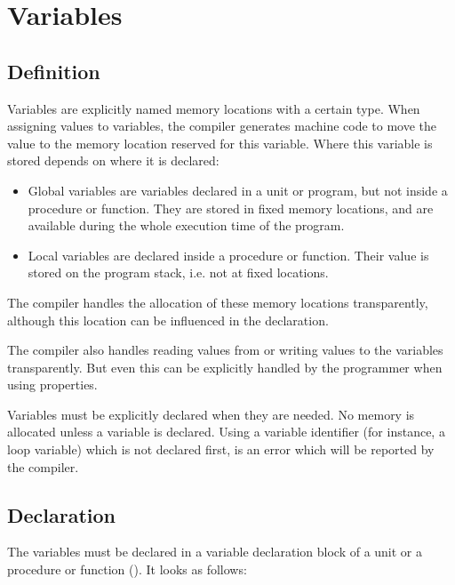 \chapter{Variables}
\label{ch:Variables}
\section{Definition}
Variables are explicitly named memory locations with a certain type. When
assigning values to variables, the \fpc compiler generates machine code 
to move the value to the memory location reserved for this variable. Where
this variable is stored depends on where it is declared:

\begin{itemize}
\item Global variables are variables declared in a unit or program, but not
inside a procedure or function. They are stored in fixed memory locations,
and are available during the whole execution time of the program.
\item Local variables are declared inside a procedure or function. Their
value is stored on the program stack, i.e. not at fixed locations.
\end{itemize}

The \fpc compiler handles the allocation of these memory locations
transparently, although this location can be influenced in the declaration.

The \fpc compiler also handles reading values from or writing values to
the variables transparently. But even this can be explicitly handled by the
programmer when using properties.

Variables must be explicitly declared when they are needed. No memory is
allocated unless a variable is declared. Using a variable identifier (for
instance, a loop variable) which is not declared first, is an error which
will be reported by the compiler. 

\section{Declaration}
The variables must be declared in a variable declaration block of a unit
or a procedure or function (). It looks as follows:



